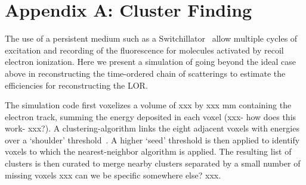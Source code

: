 \documentclass[12pt]{article}
\begin{document}

\section{Appendix A: Cluster Finding}
\label{Cluster_Finding}

The use of a persistent medium such as a Switchillator~\cite{PET_NIM_paper} allow multiple cycles of excitation and recording
of the fluorescence for molecules activated by recoil electron
ionization. Here we present a simulation of going beyond the ideal case above in reconstructing the time-ordered chain of scatterings to estimate the efficiencies for reconstructing the LOR.

The simulation code first voxelizes a volume of xxx by xxx
mm containing the electron track, summing the energy deposited in each
voxel (xxx- how does this work- xxx?). A clustering-algorithm links the
eight adjacent voxels with energies over a `shoulder'
threshold~\cite{Amidei_CDF_trigger_1988,PET_NIM_paper}. A higher `seed'
threshold is then applied to identify voxels to which the
nearest-neighbor algorithm is applied. The resulting list of clusters
is then curated to merge nearby clusters separated by a small number of
missing voxels xxx can we be specific somewhere else? xxx.
\end{document}

